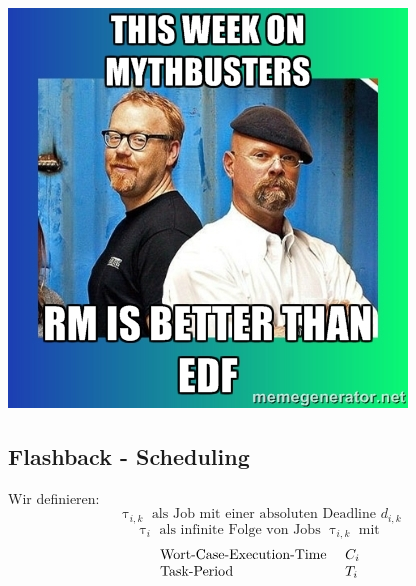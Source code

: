 \begin{frame}{\subsecname}
	\begin{center}
		\includegraphics[scale=0.6]{graphics/memes/mythbusters_thisweek.jpg}
	\end{center}
\end{frame}

\subsection{Flashback - Scheduling}
\begin{frame}{\subsecname}
	Wir definieren:
	\begin{equation}
		\uptau_{i, k} \text{ als Job mit einer absoluten Deadline } d_{i, k}
	\end{equation}
	\pause
	\begin{equation}
		\uptau_i \text{ als infinite Folge von Jobs } \uptau_{i, k} \text{ mit }
	\end{equation}
	\pause
	\begin{equation}
		\begin{array}{l l l}
			\text{Wort-Case-Execution-Time } & C_i\\
			\text{Task-Period } & T_i
		\end{array}
	\end{equation}
\end{frame}

